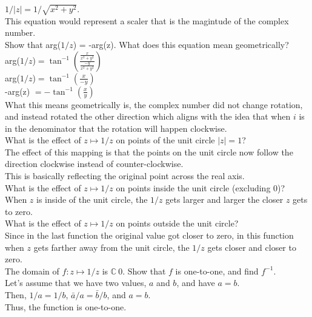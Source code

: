\documentclass[12pt]{article}
\begin{document}
$1/|z| = 1/\sqrt{x^2 + y^2}$.\\

This equation would represent a scaler that is the magintude of the complex number.\\

 Show that arg($1/z$) = -arg(z). What does this equation mean geometrically?\\

arg($1/z$)$ = \tan^{-1}(\frac{\frac{x}{x^2+y^2}}{\frac{-y}{x^2+y^2}})$\\
arg($1/z$)$ = \tan^{-1}(\frac{x}{-y})$\\
-arg(z) $ = -\tan^{-1}(\frac{x}{y})$\\

What this means geometrically is, the complex number did not change rotation, and instead rotated the other direction which aligns with the idea that when $i$ is in the denominator that the rotation will happen clockwise.\\


 What is the effect of $z \mapsto 1/z$ on points of the unit circle $|z| = 1$?\\

The effect of this mapping is that the points on the unit circle now follow the direction clockwise instead of counter-clockwise.\\
This is basically reflecting the original point across the real axis.\\


 What is the effect of $z \mapsto 1/z$ on points inside the unit circle (excluding 0)?\\

When $z$ is inside of the unit circle, the $1/z$ gets larger and larger the closer $z$ gets to zero.\\

What is the effect of $z \mapsto 1/z$ on points outside the unit circle?\\

Since in the last function the original value got closer to zero, in this function when $z$ gets farther away from the unit circle, the $1/z$ gets closer and closer to zero.\\


 The domain of $f: z \mapsto 1/z$ is $\mathbb{C} \ {0}$. Show that $f$ is one-to-one, and find $f^{-1}$.\\

Let's assume that we have two values, $a$ and $b$, and have $a = b$.\\
Then, $1/a = 1/b$, $\bar{a}/a = \bar{b}/b$, and $a = b$.\\
Thus, the function is one-to-one.\\
\end{document}
